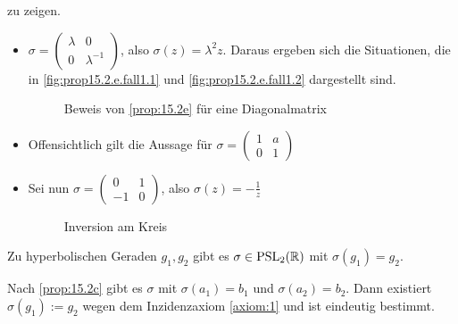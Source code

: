 \begin{beweis}
\begin{enumerate}[label=\alph*)]
              zu zeigen.
            \begin{itemize}
                \item $\sigma = \begin{pmatrix}\lambda & 0\\ 0 & \lambda^{-1}\end{pmatrix}$, also $\sigma(z) = \lambda^2 z$.
                      Daraus ergeben sich die Situationen, die in \cref{fig:prop15.2.e.fall1.1} und
                      \cref{fig:prop15.2.e.fall1.2} dargestellt sind.
                    \begin{figure}[ht]
                        \centering
                        \subfloat[Fall 1]{
                            \resizebox{0.45\linewidth}{!}{}
                            \label{fig:prop15.2.e.fall1.1}
                        }%
                        \label{fig:prop15.2.e.fall1.0}
                        \caption{Beweis von \cref{prop:15.2e} für eine Diagonalmatrix}
                    \end{figure}
                \item Offensichtlich gilt die Aussage für $\sigma = \begin{pmatrix}1 & a\\0 & 1\end{pmatrix}$
                \item Sei nun $\sigma = \begin{pmatrix}0 & 1\\-1 & 0\end{pmatrix}$, also $\sigma(z) = - \frac{1}{z}$
                    \begin{figure}[htp]
                        \centering
                        
                        \caption{Inversion am Kreis}
                        \label{fig:inversion-am-kreis}
                    \end{figure}
            \end{itemize}
    \end{enumerate}
\end{beweis}

\begin{bemerkung}%
    Zu hyperbolischen Geraden $g_1, g_2$ gibt es $\sigma \in \mathrm{PSL}_2(\mathbb{R})$
    mit $\sigma(g_1) = g_2$.
\end{bemerkung}
\begin{beweis}
    Nach \cref{prop:15.2c} gibt es $\sigma$ mit $\sigma(a_1) = b_1$
    und $\sigma(a_2) = b_2$. Dann existiert $\sigma(g_1) := g_2$
    wegen dem Inzidenzaxiom \ref{axiom:1} und ist eindeutig bestimmt.
\end{beweis}

